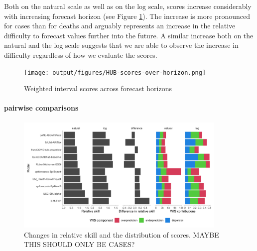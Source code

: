 \documentclass{article}
\begin{document}
Both on the natural scale as well as on the log scale, scores increase considerably with increasing forecast horizon (see Figure \ref{fig:HUB-scores-horizon}). The increase is more pronounced for cases than for deaths and arguably represents an increase in the relative difficulty to forecast values further into the future. A similar increase both on the natural and the log scale suggests that we are able to observe the increase in difficulty regardless of how we evaluate the scores. 

\begin{figure}[h!]
    \centering
    \texttt{[image: output/figures/HUB-scores-over-horizon.png]}
    \caption{Weighted interval scores across forecast horizons}
    \label{fig:HUB-scores-horizon}
\end{figure}


\paragraph{pairwise comparisons}
\begin{figure}[h!]
    \centering
    \includegraphics[width=0.9\textwidth]{output/figures/HUB-pairwise-comparisons.png}
    \caption{Changes in relative skill and the distribution of scores. MAYBE THIS SHOULD ONLY BE CASES?}
    \label{fig:HUB-pairwise}
\end{figure}
\end{document}
